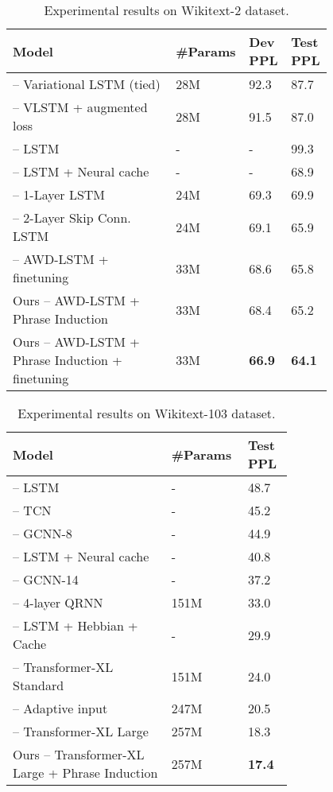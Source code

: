 \documentclass[11pt,a4paper]{article}
\begin{document}
\begin{table*}[ht]
\centering
\begin{tabular}{p{0.5\linewidth}p{0.1\linewidth}p{0.1\linewidth}p{0.1\linewidth}}
\toprule
\textbf{Model} & \textbf{\#Params} & \textbf{Dev PPL} & \textbf{Test PPL}\\
\midrule
\citet{inan2016tying} -- Variational LSTM (tied) & 28M & 92.3 & 87.7\\
\citet{inan2016tying} -- VLSTM + augmented loss & 28M & 91.5 & 87.0\\
\citet{grave2016improving} -- LSTM & - & - & 99.3\\
\citet{grave2016improving} -- LSTM + Neural cache & - & - & 68.9\\
\citet{melis2017state} -- 1-Layer LSTM & 24M & 69.3 & 69.9\\
\citet{melis2017state} -- 2-Layer Skip Conn. LSTM & 24M & 69.1 & 65.9\\
\midrule
\citet{merity2017regularizing} -- AWD-LSTM + finetuning & 33M & 68.6 & 65.8\\
\midrule
Ours -- AWD-LSTM + Phrase Induction & 33M & 68.4 & 65.2\\
Ours -- AWD-LSTM + Phrase Induction + finetuning & 33M & \textbf{66.9} & \textbf{64.1}\\
\bottomrule
\end{tabular}
\caption{Experimental results on Wikitext-2 dataset.}
\label{tab:wt2}
\end{table*}

\begin{table*}[ht]
\centering
\begin{tabular}{p{0.5\linewidth}p{0.1\linewidth}p{0.1\linewidth}}
\toprule
\textbf{Model} & \textbf{\#Params} & \textbf{Test PPL}\\
\midrule
\citet{grave2016improving} -- LSTM & - & 48.7\\
\citet{bai2018empirical} -- TCN & - & 45.2\\
\citet{dauphin2017language} -- GCNN-8 & - & 44.9\\
\citet{grave2016improving} -- LSTM + Neural cache & - & 40.8\\
\citet{dauphin2017language} -- GCNN-14 & - & 37.2\\
\citet{merity2018analysis} -- 4-layer QRNN & 151M & 33.0\\
\citet{rae2018fast} -- LSTM + Hebbian + Cache & - & 29.9\\
\citet{dai2018transformer} -- Transformer-XL Standard & 151M & 24.0\\
\citet{baevski2018adaptive} -- Adaptive input & 247M & 20.5\\
\midrule
\citet{dai2018transformer} -- Transformer-XL Large & 257M & 18.3\\
Ours -- Transformer-XL Large + Phrase Induction & 257M & \textbf{17.4}\\
\bottomrule
\end{tabular}
\caption{Experimental results on Wikitext-103 dataset.}
\label{tab:wt103}
\end{table*}
\end{document}
